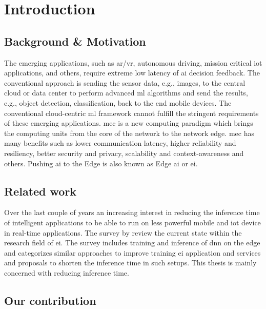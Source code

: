 \hypertarget{inroduction}{%
\chapter{Introduction}\label{sec:introduction}}
\thispagestyle{fancy}

\section{Background \& Motivation}

The emerging applications, such as \gls{ar}/\gls{vr}, autonomous driving, mission critical \gls{iot} applications, and others, require extreme low latency of \gls{ai} decision feedback. The conventional approach is sending the sensor data, e.g., images, to the central cloud or data center to perform advanced \gls{ml} algorithms and send the results, e.g., object detection, classification, back to the end mobile devices. The conventional cloud-centric \gls{ml} framework cannot fulfill the stringent requirements of these emerging applications. \gls{mec} is a new computing paradigm which brings the computing units from the core of the network to the network edge. \gls{mec} has many benefits such as lower communication latency, higher reliability and resiliency, better security and privacy, scalability and context-awareness and others. Pushing \gls{ai} to the Edge is also known as Edge \gls{ai} or \gls{ei}. 

\section{Related work}



Over the last couple of years an increasing interest in reducing the inference time of intelligent applications to be able to run on less powerful mobile and \gls{iot} device in real-time applications. The survey  by \citet{zhou_edge_2019} review the current state within the research field of \gls{ei}. The survey includes training and inference of \gls{dnn} on the edge and categorizes similar approaches to improve training \gls{ei} application and services and proposals to shorten the inference time in such setups. This thesis is mainly concerned with reducing inference time.

\section{Our contribution}

